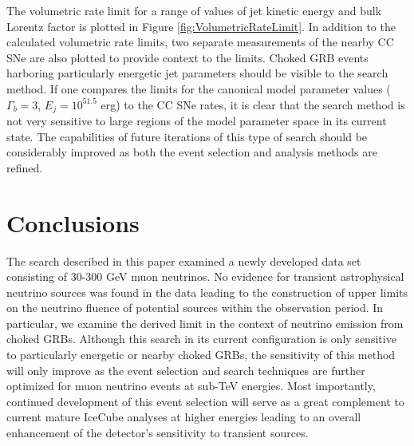 \documentclass[manuscript]{aastex}
\begin{document}
The volumetric rate limit for a range of values of jet kinetic energy and bulk Lorentz factor is plotted in Figure \ref{fig:VolumetricRateLimit}. In addition to the calculated volumetric rate limits, two separate measurements of the nearby CC SNe are also plotted to provide context to the limits. Choked GRB events harboring particularly energetic jet parameters should be visible to the search method. If one compares the limits for the canonical model parameter values ($\Gamma_b = 3$, $E_j = 10^{51.5}$ erg) to the CC SNe rates, it is clear that the search method is not very sensitive to large regions of the model parameter space in its current state. The capabilities of future iterations of this type of search should be considerably improved as both the event selection and analysis methods are refined.	
\section{Conclusions}
The search described in this paper examined a newly developed data set consisting of 30-300 GeV muon neutrinos. No evidence for transient astrophysical neutrino sources was found in the data leading to the construction of upper limits on the neutrino fluence of potential sources within the observation period. In particular, we examine the derived limit in the context of neutrino emission from choked GRBs. Although this search in its current configuration is only sensitive to particularly energetic or nearby choked GRBs, the sensitivity of this method will only improve as the event selection and search techniques are further optimized for muon neutrino events at sub-TeV energies. Most importantly, continued development of this event selection will serve as a great complement to current mature IceCube analyses at higher energies leading to an overall enhancement of the detector's sensitivity to transient sources.
\end{document}
